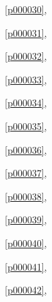 \noindent\figurename\ \ref{p000030},\ \pageref{p000030}

\noindent\figurename\ \ref{p000031},\ \pageref{p000031}

\noindent\figurename\ \ref{p000032},\ \pageref{p000032}

\noindent\figurename\ \ref{p000033},\ \pageref{p000033}

\noindent\figurename\ \ref{p000034},\ \pageref{p000034}

\noindent\figurename\ \ref{p000035},\ \pageref{p000035}

\noindent\figurename\ \ref{p000036},\ \pageref{p000036}

\noindent\figurename\ \ref{p000037},\ \pageref{p000037}

\noindent\figurename\ \ref{p000038},\ \pageref{p000038}

\noindent\figurename\ \ref{p000039},\ \pageref{p000039}

\noindent\figurename\ \ref{p000040},\ \pageref{p000040}

\noindent\figurename\ \ref{p000041},\ \pageref{p000041}

\noindent\figurename\ \ref{p000042},\ \pageref{p000042}









